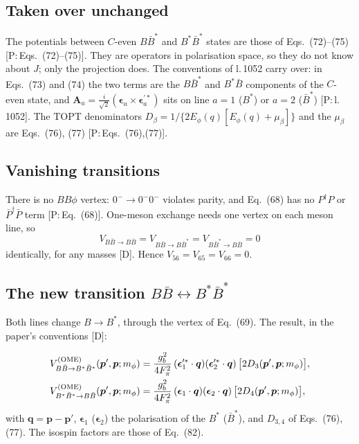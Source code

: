 \documentclass[11pt,a4paper]{article}
\newcommand{\tagP}[1]{\textcolor{blue!65!black}{\textsf{\small[P:\,#1]}}}
\newcommand{\tagD}{\textcolor{orange!85!black}{\textsf{\small[D]}}}
\newcommand{\BB}{B\bar B}
\newcommand{\BBst}{B\bar B^*}
\newcommand{\BstBst}{B^*\bar B^*}
\newcommand{\VOME}{V^{\rm (OME)}}
\newcommand{\vq}{\bm q}
\newcommand{\vep}{\bm p}
\newcommand{\veps}{\bm\epsilon}
\newcommand{\vA}{\bm A}
\begin{document}
\subsection{Taken over unchanged}

The potentials between $C$-even $\BBst$ and $\BstBst$ states are those of Eqs.~(72)--(75) \tagP{Eqs.~(72)--(75)}. They are operators in polarisation space, so they do not know about $J$; only the projection does. The conventions of l.\,1052 carry over: in Eqs.~(73) and (74) the two terms are the $\BBst$ and $B^*\bar B$ components of the $C$-even state, and $\vA_a=\frac{i}{\sqrt2}(\veps_a\times\veps_a^{\prime*})$ sits on line $a=1$ ($B^*$) or $a=2$ ($\bar B^*$) \tagP{l.\,1052}. The TOPT denominators $D_\beta=1/\{2E_\phi(q)[E_\phi(q)+\mu_\beta]\}$ and the $\mu_\beta$ are Eqs.~(76), (77) \tagP{Eqs.~(76),(77)}.

\subsection{Vanishing transitions}

There is no $BB\phi$ vertex: $0^-\to0^-0^-$ violates parity, and Eq.~(68) has no $P^\dagger P$ or $\bar P^\dagger\bar P$ term \tagP{Eq.~(68)}. One-meson exchange needs one vertex on each meson line, so
\begin{equation}
V_{\BB\to\BB}=V_{\BB\to\BBst}=V_{\BBst\to\BB}=0
\end{equation}
identically, for any masses \tagD. Hence $V_{56}=V_{65}=V_{66}=0$.

\subsection{The new transition $\BB\leftrightarrow\BstBst$}
\label{sec:new}

Both lines change $B\to B^*$, through the vertex of Eq.~(69). The result, in the paper's conventions \tagD:
\begin{keybox}
\begin{align}
\VOME_{\BB\to\BstBst}(\bm p',\bm p;m_\phi)&=\frac{g_b^2}{4F_\pi^2}\,(\veps_1^{\prime*}\cdot\vq)(\veps_2^{\prime*}\cdot\vq)\,\big[2D_3(\bm p',\bm p;m_\phi)\big],\label{eq:VPPVV}\\
\VOME_{\BstBst\to\BB}(\bm p',\bm p;m_\phi)&=\frac{g_b^2}{4F_\pi^2}\,(\veps_1\cdot\vq)(\veps_2\cdot\vq)\,\big[2D_4(\bm p',\bm p;m_\phi)\big],\label{eq:VVVPP}
\end{align}
with $\vq=\vep-\vep'$, $\veps_{1}$ ($\veps_2$) the polarisation of the $B^*$ ($\bar B^*$), and $D_{3,4}$ of Eqs.~(76),(77). The isospin factors are those of Eq.~(82).
\end{keybox}
\end{document}
